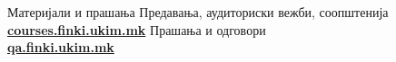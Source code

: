 \begin{frame}{Материјали и прашања}{}
    Предавања, аудиториски вежби, соопштенија\\
    \href{http://courses.finki.ukim.mk/}{\textbf{courses.finki.ukim.mk}}
    \vfill
    Прашања и одговори\\
    \href{http://qa.finki.ukim.mk}{\textbf{qa.finki.ukim.mk}}
\end{frame}